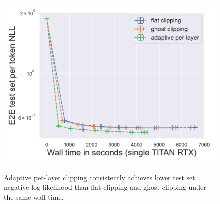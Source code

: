 \begin{figure}[htb]
\begin{center}
\begin{minipage}[t]{0.5\linewidth}
\centering
{\includegraphics[width=0.95\linewidth]{files/fig/walltime_e2e_test_nll.pdf}} \end{minipage}
\end{center}
\caption{
Adaptive per-layer clipping consistently achieves lower test set negative log-likelihood than flat clipping and ghost clipping under the same wall time.
}
\label{fig:gpt2runtime-overall-nll}
\end{figure}



